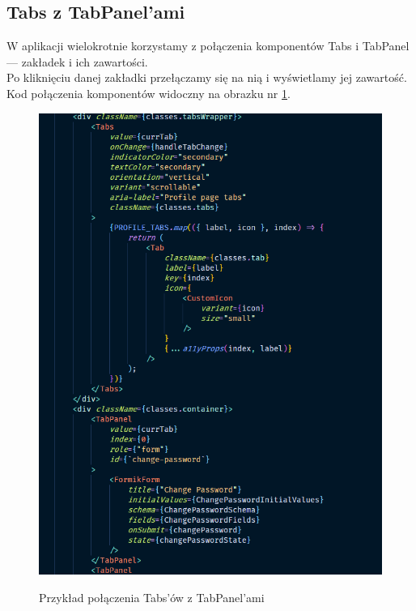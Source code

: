 \documentclass[a4paper,11pt]{report}
\begin{document}
\subsection{Tabs z TabPanel'ami}
\label{subsec:tabs}
W aplikacji wielokrotnie korzystamy z połączenia komponentów Tabs i TabPanel — zakładek i ich zawartości.\\
Po kliknięciu danej zakładki przełączamy się na nią i wyświetlamy jej zawartość.
Kod połączenia komponentów widoczny na obrazku nr \ref{fig:tabs}.
\begin{figure}[H]
	\centering
	\includegraphics[scale=0.5]{implementacja/frontend/tabs}\\
	\caption{Przykład połączenia Tabs'ów z TabPanel'ami}
	\label{fig:tabs}
\end{figure}
\end{document}
